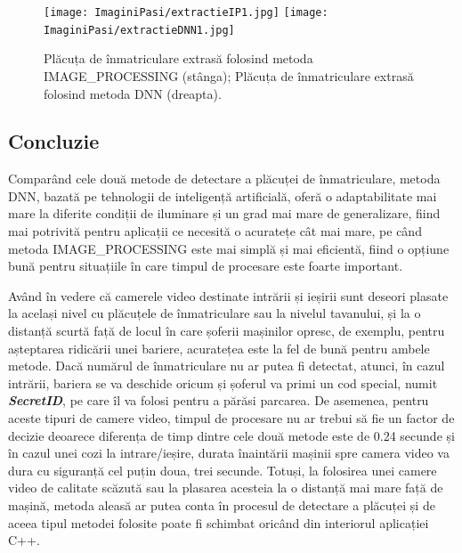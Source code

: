 \documentclass[12pt]{article}
\begin{document}
\begin{figure}[H]
  \centering
  \texttt{[image: ImaginiPasi/extractieIP1.jpg]}\hfill
    \texttt{[image: ImaginiPasi/extractieDNN1.jpg]}
  \caption{Pl\u{a}cuța de \^{i}nmatriculare extras\u{a} folosind metoda IMAGE\_PROCESSING (st\^{a}nga); Pl\u{a}cuța de \^{i}nmatriculare extras\u{a} folosind metoda DNN (dreapta).}
  \label{fig:extractie_dnn}
\end{figure}

\subsection{Concluzie}

Compar\^{a}nd cele dou\u{a} metode de detectare a pl\u{a}cuței de \^{i}nmatriculare, metoda DNN, bazat\u{a} pe tehnologii de inteligenț\u{a} artificial\u{a}, ofer\u{a} o adaptabilitate mai mare la diferite condiții de iluminare și un grad mai mare de generalizare, fiind mai potrivit\u{a} pentru aplicații ce necesit\u{a} o acuratețe c\^{a}t mai mare, pe c\^{a}nd metoda IMAGE\_PROCESSING este mai simpl\u{a} și mai eficient\u{a}, fiind o opțiune bun\u{a} pentru situațiile \^{i}n care timpul de procesare este foarte important. 

Av\^{a}nd \^{i}n vedere c\u{a} camerele video destinate intr\u{a}rii și ieșirii sunt deseori plasate la același nivel cu pl\u{a}cuțele de \^{i}nmatriculare sau la nivelul tavanului, și la o distanț\u{a} scurt\u{a} faț\u{a} de locul \^{i}n care șoferii mașinilor opresc, de exemplu, pentru așteptarea ridic\u{a}rii unei bariere, acuratețea este la fel de bun\u{a} pentru ambele metode. Dac\u{a} num\u{a}rul de \^{i}nmatriculare nu ar putea fi detectat, atunci, \^{i}n cazul intr\u{a}rii, bariera se va deschide oricum și șoferul va primi un cod special, numit \textbf{\textit{SecretID}}, pe care \^{i}l va folosi pentru a p\u{a}r\u{a}si parcarea. De asemenea, pentru aceste tipuri de camere video, timpul de procesare nu ar trebui s\u{a} fie un factor de decizie deoarece diferența de timp dintre cele dou\u{a} metode este de 0.24 secunde și \^{i}n cazul unei cozi la intrare/ieșire, durata \^{i}naint\u{a}rii mașinii spre camera video va dura cu siguranț\u{a} cel puțin doua, trei secunde. Totuși, la folosirea unei camere video de calitate sc\u{a}zut\u{a} sau la plasarea acesteia la o distanț\u{a} mai mare faț\u{a} de mașin\u{a}, metoda aleas\u{a} ar putea conta \^{i}n procesul de detectare a pl\u{a}cuței și de aceea tipul metodei folosite poate fi schimbat oric\^{a}nd din interiorul aplicației C++.
\end{document}
